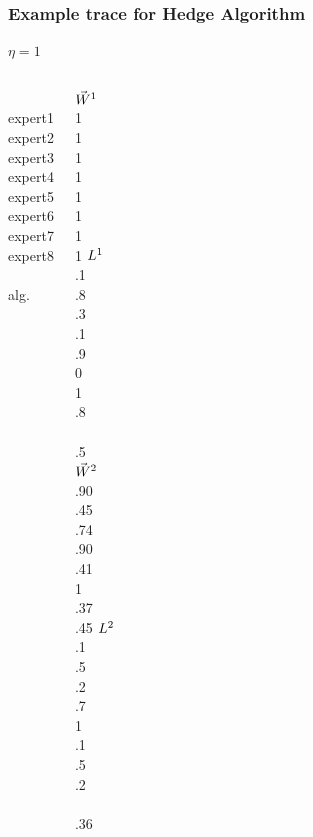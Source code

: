 \documentclass{beamer}
\begin{document}
\begin{frame} 
\frametitle{Example trace for Hedge Algorithm} 

$\eta=1$\\
\begin{columns} 
\column[t]{3cm}
~\\  expert1\\ expert2\\ expert3\\ expert4 \\ expert5\\ expert6\\ expert7\\ expert8 \\ ~\\ 
\color<2>{red} alg. 

\column[t]{1cm}
 $\vec{W}^1$ \\  1 \\  1  \\  1  \\  1  \\  1 \\  1 \\  1  \\  1 
\column[t]{1cm}
 $L^1$ \\ .1 \\ .8  \\ .3  \\ .1  \\ .9 \\  0 \\  1  \\ .8 \\ ~ \\
\color<5>{red} .5 \\

\column[t]{1cm}
 $\vec{W}^2$ \\  .90\\  .45\\.74 \\ .90 \\ .41\\  1 \\ .37 \\ .45 
\column[t]{1cm}
 $L^2$ \\ .1 \\ .5 \\ .2  \\ .7 \\ 1 \\  .1 \\  .5  \\ .2 \\ ~ \\
 .36 \\


\end{columns}
\end{frame}
\end{document}
